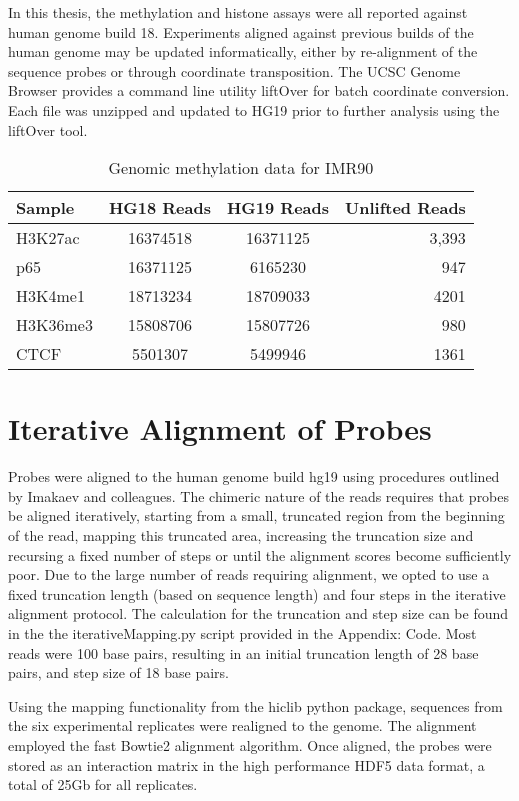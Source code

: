 In this thesis, the methylation and histone assays were all reported against human genome build 18.  Experiments aligned
against previous builds of the human genome may be updated informatically, either by re-alignment of the
sequence probes or through coordinate transposition.  The UCSC Genome Browser provides a command line utility liftOver for
batch coordinate conversion.  Each file was unzipped and updated to HG19 prior to further analysis using the liftOver tool.

\begin{table}
  \centering
  \begin{tabular}{lccr}
    \hline
    Sample & HG18 Reads & HG19 Reads & Unlifted Reads \\ \hline
    H3K27ac & 16374518 & 16371125 & 3,393 \\
    p65 & 16371125 & 6165230 & 947 \\
    H3K4me1 & 18713234 & 18709033 & 4201 \\
    H3K36me3 & 15808706 & 15807726 & 980 \\
    CTCF & 5501307 & 5499946 & 1361 \\
    \hline
  \end{tabular}
  \caption{Genomic methylation data for IMR90}
\end{table}

\chapter{Iterative Alignment of Probes}

Probes were aligned to the human genome build hg19 using procedures outlined by
Imakaev and colleagues\cite{imakaev2012}.  The chimeric nature of the reads
requires that probes be aligned iteratively, starting from a small, truncated
region from the beginning of the read, mapping this truncated area, increasing
the truncation size and recursing a fixed number of steps or until the alignment
scores become sufficiently poor.  Due to the large number of reads requiring
alignment, we opted to use a fixed truncation length (based on sequence length)
and four steps in the iterative alignment protocol.  The calculation
for the truncation and step size can be found in the the iterativeMapping.py
script provided in the Appendix: Code.  Most reads were 100 base pairs, resulting
in an initial truncation length of 28 base pairs, and step size of 18 base pairs.

Using the mapping functionality from the hiclib python package\cite{imakaev2012},
sequences from the six experimental replicates were realigned to the genome.  The
alignment employed the fast Bowtie2 alignment algorithm\cite{langmead2012}.  Once
aligned, the probes were stored as an interaction matrix in the high performance
HDF5\cite{hdf5} data format, a total of 25Gb for all replicates.

